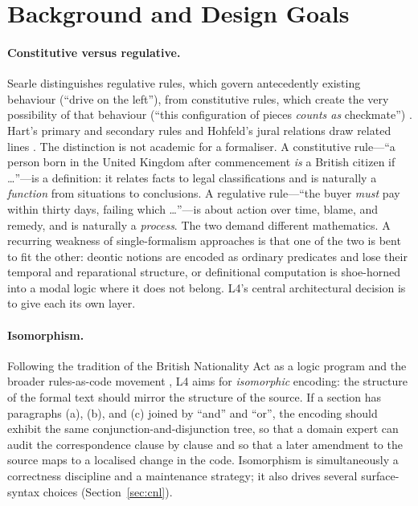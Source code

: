 \documentclass[sigconf,nonacm]{acmart}
\begin{document}
\section{Background and Design Goals}\label{sec:background}
\paragraph{Constitutive versus regulative.}
Searle distinguishes regulative rules, which govern antecedently existing
behaviour (``drive on the left''), from constitutive rules, which create
the very possibility of that behaviour (``this configuration of pieces
\emph{counts as} checkmate'') \cite{searle1969speech}. Hart's primary and
secondary rules and Hohfeld's jural relations draw related lines
\cite{hart1961concept,hohfeld1913}. The distinction is not academic for a
formaliser. A constitutive rule---``a person born in the United Kingdom
after commencement \emph{is} a British citizen if \ldots''---is a
definition: it relates facts to legal classifications and is naturally a
\emph{function} from situations to conclusions. A regulative rule---``the
buyer \emph{must} pay within thirty days, failing which \ldots''---is about
action over time, blame, and remedy, and is naturally a \emph{process}. The
two demand different mathematics. A recurring weakness of single-formalism
approaches is that one of the two is bent to fit the other: deontic notions
are encoded as ordinary predicates and lose their temporal and reparational
structure, or definitional computation is shoe-horned into a modal logic
where it does not belong. L4's central architectural decision is to give
each its own layer.

\paragraph{Isomorphism.}
Following the tradition of the British Nationality Act as a logic program
\cite{sergot1986bna} and the broader rules-as-code movement
\cite{mohun2020rulesascode}, L4 aims for \emph{isomorphic} encoding: the
structure of the formal text should mirror the structure of the source. If
a section has paragraphs (a), (b), and (c) joined by ``and'' and ``or'', the
encoding should exhibit the same conjunction-and-disjunction tree, so that a
domain expert can audit the correspondence clause by clause and so that a
later amendment to the source maps to a localised change in the
code. Isomorphism is simultaneously a correctness discipline and a
maintenance strategy; it also drives several surface-syntax choices
(Section~\ref{sec:cnl}).
\end{document}
